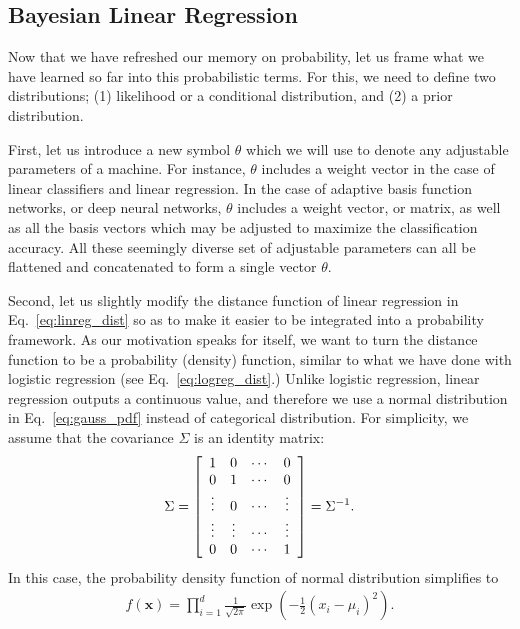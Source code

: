 \documentclass{report}
\newcommand{\vect}[1]{\mathbf{#1}}
\newcommand{\vx}[0]{\vect{x}}
\begin{document}
\subsection{Bayesian Linear Regression}

Now that we have refreshed our memory on probability, let us frame what we have
learned so far into this probabilistic terms. For this, we need to define two
distributions; (1) likelihood or a conditional distribution, and (2) a prior
distribution. 

First, let us introduce a new symbol $\theta$ which we will use to denote any
adjustable parameters of a machine. For instance, $\theta$ includes a weight
vector in the case of linear classifiers and linear regression. In the case of
adaptive basis function networks, or deep neural networks, $\theta$ includes a
weight vector, or matrix, as well as all the basis vectors which may be adjusted
to maximize the classification accuracy. All these seemingly diverse set of
adjustable parameters can all be flattened and concatenated to form a single
vector $\theta$. 

Second, let us slightly modify the distance function of linear regression in
Eq.~\eqref{eq:linreg_dist} so as to make it easier to be integrated into a
probability framework. As our motivation speaks for itself, we want to turn the
distance function to be a probability (density) function, similar to what we
have done with logistic regression (see Eq.~\eqref{eq:logreg_dist}.) Unlike
logistic regression, linear regression outputs a continuous value, and therefore
we use a normal distribution in Eq.~\eqref{eq:gauss_pdf} instead of categorical
distribution. For simplicity, we assume that the covariance $\Sigma$ is an
identity matrix:
\begin{align*}
    \Sigma = 
    \left[
        \begin{array}{c c c c}
            1 & 0 & \cdots & 0 \\
            0 & 1 & \cdots & 0 \\
            \vdots & 0 & \cdots & \vdots \\
            \vdots & \vdots & \cdots & \vdots \\
            0 & 0 & \cdots & 1 
        \end{array}
    \right] = \Sigma^{-1}.
\end{align*}
In this case, the probability density function of normal distribution simplifies
to 
\begin{align}
    \label{eq:gauss_pdf_identity}
    f(\vx) = \prod_{i=1}^d 
    \frac{1}{\sqrt{2\pi}}
    \exp\left(
        -\frac{1}{2} (x_i - \mu_i)^2
    \right).
\end{align}
\end{document}
